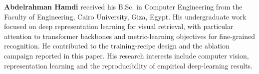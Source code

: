 \medskip\noindent\textbf{Abdelrahman Hamdi} received his B.Sc. in Computer
Engineering from the Faculty of Engineering, Cairo University, Giza, Egypt. His
undergraduate work focused on deep representation learning for visual
retrieval, with particular attention to transformer backbones and
metric-learning objectives for fine-grained recognition. He contributed to the
training-recipe design and the ablation campaign reported in this paper. His
research interests include computer vision, representation learning and the
reproducibility of empirical deep-learning results.
